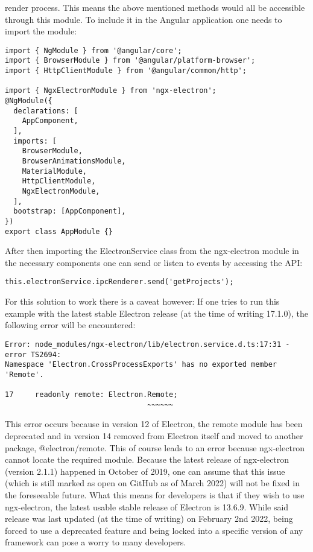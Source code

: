 render process.
This means the above mentioned methods would all be accessible through this module. 
To include it in the Angular application one needs to import the module:
\begin{lstlisting}
import { NgModule } from '@angular/core';
import { BrowserModule } from '@angular/platform-browser';
import { HttpClientModule } from '@angular/common/http';

import { NgxElectronModule } from 'ngx-electron';
@NgModule({
  declarations: [
    AppComponent,
  ],
  imports: [
    BrowserModule,
    BrowserAnimationsModule,
    MaterialModule,
    HttpClientModule,
    NgxElectronModule,
  ],
  bootstrap: [AppComponent],
})
export class AppModule {}
\end{lstlisting}
After then importing the ElectronService class from the ngx-electron module in the necessary components 
one can send or listen to events by accessing the API:
\begin{lstlisting}
this.electronService.ipcRenderer.send('getProjects');
\end{lstlisting}
For this solution to work there is a caveat however: 
If one tries to run this example with the latest stable Electron release (at the time of writing 17.1.0), the 
following error will be encountered:
\begin{lstlisting}
Error: node_modules/ngx-electron/lib/electron.service.d.ts:17:31 - error TS2694: 
Namespace 'Electron.CrossProcessExports' has no exported member 'Remote'.

17     readonly remote: Electron.Remote;
                                 ~~~~~~
\end{lstlisting}
This error occurs because in version 12 of Electron, the remote module has been deprecated and in version 14
removed from Electron itself and moved to another package, @electron/remote. \parencite{electron14Blog}
This of course leads to an error because ngx-electron cannot locate the required module. 
Because the latest release of ngx-electron (version 2.1.1) happened in October of 2019, one can 
assume that this issue (which is still marked as open on GitHub as of March 2022) will not be fixed in 
the foreseeable future. \parencite{namespaceError}
What this means for developers is that if they wish to use ngx-electron, the latest usable stable release
of Electron is 13.6.9. 
While said release was last updated (at the time of writing) on February 2nd 2022, being forced to use
a deprecated feature and being locked into a specific version of any framework can pose a worry to 
many developers. \paragraph{}
